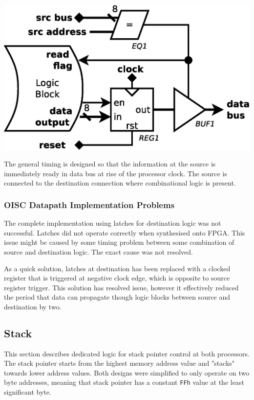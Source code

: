 \begin{colfigure}
	\centering
	\includegraphics[width=\linewidth]{../resources/oisc_cell_out.eps}
	\label{fig:oisc_cell_out}
\end{colfigure}

The general timing is designed so that the information at the source is immediately ready in data bus at rise of the processor clock. The source is connected to the destination connection where combinational logic is present. 

\subsubsection{OISC Datapath Implementation Problems} \label{subsec:oisc_cell_issue}

The complete implementation using latches for destination logic was not successful. Latches did not operate correctly when synthesised onto FPGA. This issue might be caused by some timing problem between some combination of source and destination logic. The exact cause was not resolved.

As a quick solution, latches at destination has been replaced with a clocked register that is triggered at negative clock edge, which is opposite to source register trigger. This solution has resolved issue, however it effectively reduced the period that data can propagate though logic blocks between source and destination by two.

\subsection{Stack} \label{subsec:stack}
This section describes dedicated logic for stack pointer control at both processors. The stack pointer starts from the highest memory address value and "stacks" towards lower address values. Both designs were simplified to only operate on two byte addresses, meaning that stack pointer has a constant \texttt{FFh} value at the least significant byte.


